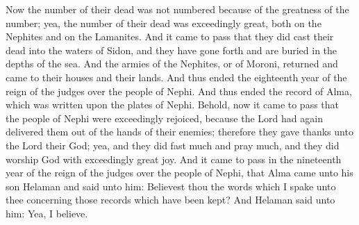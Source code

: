 \bverse \iffalse Now the number of their dead was not numbered because of the greatness of the number; yea, the number of their dead was exceedingly great, both on the Nephites and on the Lamanites. \fi
Now the number of their dead was not numbered because of the greatness of the number; yea, the number of their dead was exceedingly great, both on the Nephites and on the Lamanites.
\bverse \iffalse And it came to pass that they did cast their dead into the waters of Sidon, and they have gone forth and are buried in the depths of the sea. \fi
And it came to pass that they did cast their dead into the waters of Sidon, and they have gone forth and are buried in the depths of the sea.
\bverse \iffalse And the armies of the Nephites, or of Moroni, returned and came to their houses and their lands. \fi
And the armies of the Nephites, or of Moroni, returned and came to their houses and their lands.
\bverse \iffalse And thus ended the eighteenth year of the reign of the judges over the people of Nephi. And thus ended the record of Alma, which was written upon the plates of Nephi. \fi
And thus ended the eighteenth year of the reign of the judges over the people of Nephi. And thus ended the record of Alma, which was written upon the plates of Nephi.
\bchapter
\bverse \iffalse Behold, now it came to pass that the people of Nephi were exceedingly rejoiced, because the Lord had again delivered them out of the hands of their enemies; therefore they gave thanks unto the Lord their God; yea, and they did fast much and pray much, and they did worship God with exceedingly great joy. \fi
Behold, now it came to pass that the people of Nephi were exceedingly rejoiced, because the Lord had again delivered them out of the hands of their enemies; therefore they gave thanks unto the Lord their God; yea, and they did fast much and pray much, and they did worship God with exceedingly great joy.
\bverse \iffalse And it came to pass in the nineteenth year of the reign of the judges over the people of Nephi, that Alma came unto his son Helaman and said unto him: Believest thou the words which I spake unto thee concerning those records which have been kept? \fi
And it came to pass in the nineteenth year of the reign of the judges over the people of Nephi, that Alma came unto his son Helaman and said unto him: Believest thou the words which I spake unto thee concerning those records which have been kept?
\bverse \iffalse And Helaman said unto him: Yea, I believe. \fi
And Helaman said unto him: Yea, I believe.

